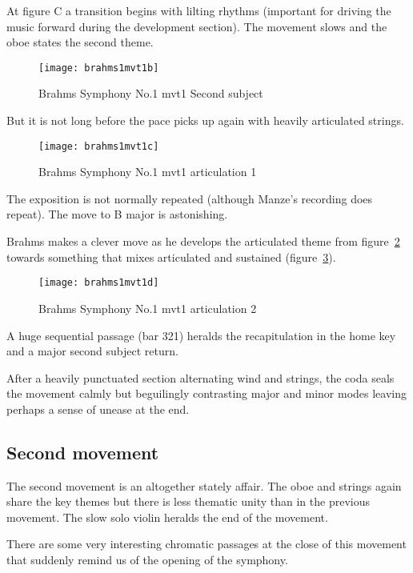At figure C a transition begins with lilting rhythms (important for driving the music forward during the development section). The movement slows and the oboe states the second theme.

\begin{figure}[H]
\centering
\texttt{[image: brahms1mvt1b]}\caption{Brahms Symphony No.1 mvt1 Second subject}
\label{fig:b1m1second}
\end{figure}

But it is not long before the pace picks up again with heavily articulated strings.

\begin{figure}[H]
\centering
\texttt{[image: brahms1mvt1c]}\caption{Brahms Symphony No.1 mvt1 articulation 1}
\label{fig:b1m1rhythmic1}
\end{figure}

The exposition is not normally repeated (although Manze's recording does repeat). The move to B major is astonishing. 

Brahms makes a clever move as he develops the articulated theme from figure~\ref{fig:b1m1rhythmic1} towards something that mixes articulated and sustained (figure~\ref{fig:b1m1rhythmic2}).

\begin{figure}[H]
\centering
\texttt{[image: brahms1mvt1d]}\caption{Brahms Symphony No.1 mvt1 articulation 2}
\label{fig:b1m1rhythmic2}
\end{figure}

A huge sequential passage (bar 321) heralds the recapitulation in the home key and a major second subject return. 

After a heavily punctuated section alternating wind and strings, the coda seals the movement calmly but beguilingly contrasting major and minor modes leaving perhaps a sense of unease at the end.  

\subsection{Second movement} 
The second movement is an altogether stately affair. The oboe and strings again share the key themes but there is less thematic unity than in the previous movement. The slow solo violin heralds the end of the movement. 

There are some very interesting chromatic passages at the close of this movement that suddenly remind us of the opening of the symphony. 

